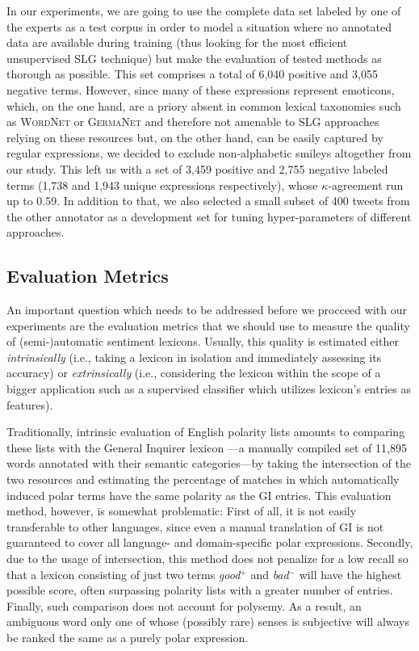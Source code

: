 In our experiments, we are going to use the complete data set labeled
by one of the experts as a test corpus in order to model a situation
where no annotated data are available during training (thus looking
for the most efficient unsupervised SLG technique) but make the
evaluation of tested methods as thorough as possible.  This set
comprises a total of 6,040 positive and 3,055 negative terms.
However, since many of these expressions represent emoticons, which,
on the one hand, are a priory absent in common lexical taxonomies such
as \textsc{WordNet} \cite{Miller:95,Miller:07} or \textsc{GermaNet}
\cite{Hamp:97} and therefore not amenable to SLG approaches relying on
these resources but, on the other hand, can be easily captured by
regular expressions, we decided to exclude non-alphabetic smileys
altogether from our study.  This left us with a set of 3,459 positive
and 2,755 negative labeled terms (1,738 and 1,943 unique expressions
respectively), whose $\kappa$-agreement run up to 0.59.  In addition
to that, we also selected a small subset of 400 tweets from the other
annotator as a development set for tuning hyper-parameters of
different approaches.

\subsection{Evaluation Metrics}\label{subsec:snt-lex:eval-metrics}

An important question which needs to be addressed before we procceed
with our experiments are the evaluation metrics that we should use to
measure the quality of (semi-)automatic sentiment lexicons.  Usually,
this quality is estimated either \textit{intrinsically} (i.e., taking
a lexicon in isolation and immediately assessing its accuracy) or
\textit{extrinsically} (i.e., considering the lexicon within the scope
of a bigger application such as a supervised classifier which utilizes
lexicon's entries as features).

Traditionally, intrinsic evaluation of English polarity lists amounts
to comparing these lists with the General Inquirer lexicon \cite[GI;
][]{Stone:66}---a manually compiled set of 11,895 words annotated with
their semantic categories---by taking the intersection of the two
resources and estimating the percentage of matches in which
automatically induced polar terms have the same polarity as the GI
entries.  This evaluation method, however, is somewhat problematic:
First of all, it is not easily transferable to other languages, since
even a manual translation of GI is not guaranteed to cover all
language- and domain-specific polar expressions.  Secondly, due to the
usage of intersection, this method does not penalize for a low recall
so that a lexicon consisting of just two terms \textit{good}$^+$ and
\textit{bad}$^-$ will have the highest possible score, often
surpassing polarity lists with a greater number of entries.  Finally,
such comparison does not account for polysemy.  As a result, an
ambiguous word only one of whose (possibly rare) senses is subjective
will always be ranked the same as a purely polar expression.


